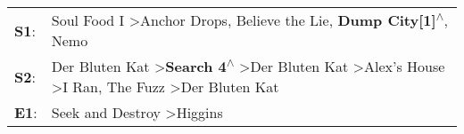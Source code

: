 \begin{supertabular}{p{0.03\textwidth}p{0.92\textwidth}}
 \textbf{S1}:  &                                                                                                                                 Soul Food I\textsuperscript{} \textgreater \enspace Anchor Drops\textsuperscript{}, \enspace Believe the Lie\textsuperscript{}, \enspace \textbf{Dump City[1]\textsuperscript{$\wedge$}}, \enspace Nemo\textsuperscript{}  \enspace  \\
 \textbf{S2}:  &  Der Bluten Kat\textsuperscript{} \textgreater \enspace \textbf{Search 4\textsuperscript{$\wedge$}} \textgreater \enspace Der Bluten Kat\textsuperscript{} \textgreater \enspace Alex's House\textsuperscript{} \textgreater \enspace I Ran\textsuperscript{}, \enspace The Fuzz\textsuperscript{} \textgreater \enspace Der Bluten Kat\textsuperscript{}  \enspace  \\
 \textbf{E1}:  &                                                                                                                                                                                                                                                                        Seek and Destroy\textsuperscript{} \textgreater \enspace Higgins\textsuperscript{}  \enspace  \\
\end{supertabular}
